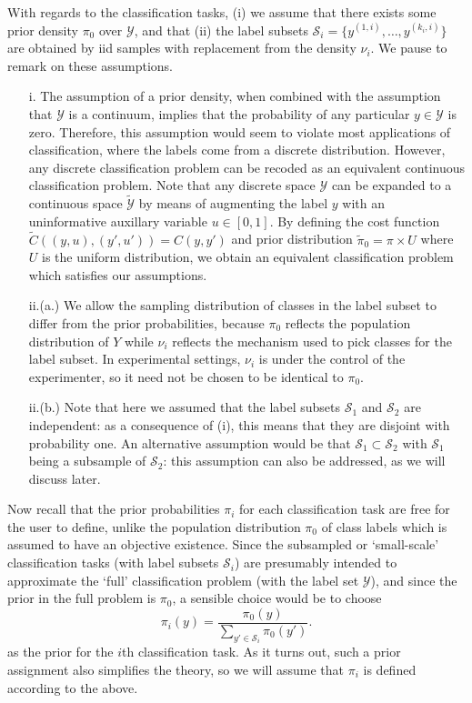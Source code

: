 \documentclass[12pt]{article}
\begin{document}
With regards to the classification tasks, (i) we assume that there
exists some prior density $\pi_0$ over $\mathcal{Y}$, and that (ii)
the label subsets $\mathcal{S}_i = \{y^{(1,i)}, \hdots, y^{(k_i,i)}\}$
are obtained by iid samples with replacement from the density $\nu_i$.
We pause to remark on these assumptions.
\begin{itemize}
\item[i.]
The assumption of a prior density, when combined with the assumption
that $\mathcal{Y}$ is a continuum, implies that the probability of any
particular $y \in \mathcal{Y}$ is zero.  Therefore, this assumption
would seem to violate most applications of classification, where the
labels come from a discrete distribution.  However, any discrete
classification problem can be recoded as an equivalent continuous
classification problem.  Note that any discrete space $\mathcal{Y}$
can be expanded to a continuous space $\tilde{\mathcal{Y}}$ by means
of augmenting the label $y$ with an uninformative auxillary variable
$u \in [0,1]$.  By defining the cost function $\tilde{C}((y, u), (y',
u')) = C(y, y')$ and prior distribution $\tilde{\pi}_0 = \pi \times U$
where $U$ is the uniform distribution, we obtain an equivalent
classification problem which satisfies our assumptions.
\item[ii.(a.)]
We allow the sampling distribution of classes in the label subset to
differ from the prior probabilities, because $\pi_0$ reflects the
population distribution of $Y$ while $\nu_i$ reflects the mechanism
used to pick classes for the label subset.  In experimental settings,
$\nu_i$ is under the control of the experimenter, so it need not be
chosen to be identical to $\pi_0$.
\item[ii.(b.)]
Note that here we assumed that the label subsets $\mathcal{S}_1$ and
$\mathcal{S}_2$ are independent: as a consequence of (i), this means
that they are disjoint with probability one.  An alternative
assumption would be that $\mathcal{S}_1 \subset
\mathcal{S}_2$ with $\mathcal{S}_1$ being a subsample of
$\mathcal{S}_2$: this assumption can also be addressed, as we will
discuss later.
\end{itemize}

Now recall that the prior probabilities $\pi_i$ for each
classification task are free for the user to define, unlike the
population distribution $\pi_0$ of class labels which is assumed to
have an objective existence.  Since the subsampled or `small-scale'
classification tasks (with label subsets $\mathcal{S}_i$) are
presumably intended to approximate the `full' classification problem
(with the label set $\mathcal{Y}$), and since the prior in the full
problem is $\pi_0$, a sensible choice would be to choose
\[
\pi_i(y) = \frac{\pi_0(y)}{\sum_{y' \in \mathcal{S}_i} \pi_0(y')}.
\]
as the prior for the $i$th classification task.  As it turns out, such
a prior assignment also simplifies the theory, so we will assume that
$\pi_i$ is defined according to the above.
\end{document}
